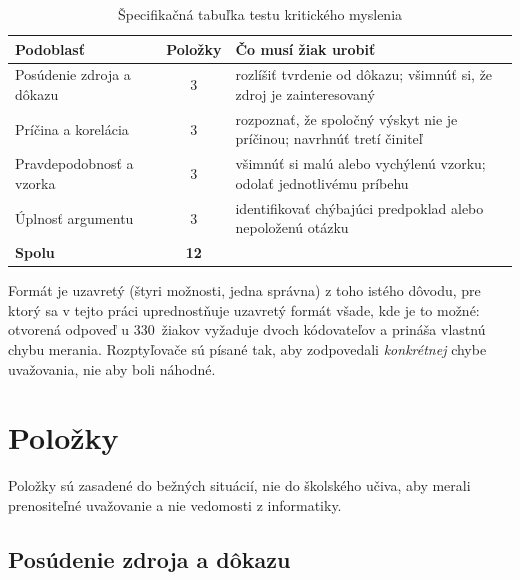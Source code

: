 \begin{table}[H]
\centering
\caption{Špecifikačná tabuľka testu kritického myslenia}
\label{tab:ct-blueprint}
\small
\begin{tabularx}{\textwidth}{@{}l c X@{}}
\toprule
\textbf{Podoblasť} & \textbf{Položky} & \textbf{Čo musí žiak urobiť} \\
\midrule
Posúdenie zdroja a dôkazu & 3 & rozlíšiť tvrdenie od dôkazu; všimnúť si, že zdroj je zainteresovaný \\
Príčina a korelácia & 3 & rozpoznať, že spoločný výskyt nie je príčinou; navrhnúť tretí činiteľ \\
Pravdepodobnosť a vzorka & 3 & všimnúť si malú alebo vychýlenú vzorku; odolať jednotlivému príbehu \\
Úplnosť argumentu & 3 & identifikovať chýbajúci predpoklad alebo nepoloženú otázku \\
\midrule
\textbf{Spolu} & \textbf{12} & \\
\bottomrule
\end{tabularx}
\end{table}

Formát je uzavretý (štyri možnosti, jedna správna) z toho istého dôvodu, pre ktorý sa v tejto práci uprednostňuje uzavretý formát všade, kde je to možné: otvorená odpoveď u 330~žiakov vyžaduje dvoch kódovateľov a prináša vlastnú chybu merania. Rozptyľovače sú písané tak, aby zodpovedali \emph{konkrétnej} chybe uvažovania, nie aby boli náhodné.

\section{Položky}

Položky sú zasadené do bežných situácií, nie do školského učiva, aby merali prenositeľné uvažovanie a nie vedomosti z informatiky.

\subsection*{Posúdenie zdroja a dôkazu}

